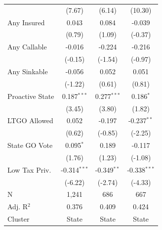 \begin{tabular*}{\textwidth}{@{\extracolsep{\fill}}lccc}
                               & (7.67)                       & (6.14)                       & (10.30)\\   
   Any Insured                 & 0.043                         & 0.084                         & -0.039\\   
                               & (0.79)                       & (1.09)                       & (-0.37)\\   
   Any Callable                & -0.016                        & -0.224                        & -0.216\\   
                               & (-0.15)                      & (-1.54)                      & (-0.97)\\   
   Any Sinkable                & -0.056                        & 0.052                         & 0.051\\   
                               & (-1.22)                      & (0.61)                       & (0.81)\\   
   Proactive State             & 0.187$^{***}$                 & 0.277$^{***}$                 & 0.186$^{*}$\\   
                               & (3.45)                       & (3.80)                       & (1.82)\\   
   LTGO Allowed                & 0.052                         & -0.197                        & -0.237$^{**}$\\   
                               & (0.62)                       & (-0.85)                      & (-2.25)\\   
   State GO Vote               & 0.095$^{*}$                   & 0.189                         & -0.117\\   
                               & (1.76)                       & (1.23)                       & (-1.08)\\   
   Low Tax Priv.               & -0.314$^{***}$                & -0.349$^{**}$                 & -0.338$^{***}$\\   
                               & (-6.22)                      & (-2.74)                      & (-4.33)\\   
   \hline
   N                & 1,241                         & 686                           & 667\\  
   Adj. R$^2$              & 0.376                         & 0.409                         & 0.424\\  
   Cluster              & State & State & State\\  
   \bottomrule
\end{tabular*}
\par\endgroup
